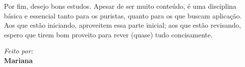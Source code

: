 \documentclass[../main.tex]{subfiles}
\begin{document}
	Por fim, desejo bons estudos. Apesar de ser muito conteúdo, é uma disciplina básica e essencial tanto para os puristas, quanto para os que buscam aplicação. Aos que estão iniciando, aproveitem essa parte inicial; aos que estão revisando, espero que tirem bom proveito para rever (quase) tudo concisamente.
	
	\vfill 
	
	\begin{flushright}
		\textit{Feito por:}\\
		\textbf{Mariana}
	\end{flushright}
	
\end{document}

